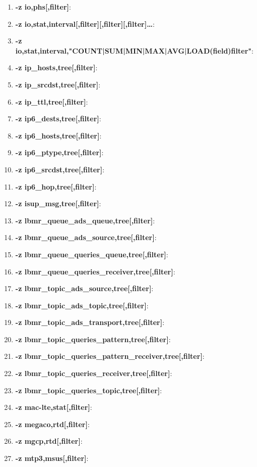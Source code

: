 \begin{enumerate}
    \item \textbf{-z io,phs[,filter]}: 
    \item \textbf{-z io,stat,interval[,filter][,filter][,filter]…​}: 
    \item \textbf{-z io,stat,interval,"COUNT|SUM|MIN|MAX|AVG|LOAD(field)filter"}: 
    \item \textbf{-z ip\_hosts,tree[,filter]}: 
    \item \textbf{-z ip\_srcdst,tree[,filter]}: 
    \item \textbf{-z ip\_ttl,tree[,filter]}: 
    \item \textbf{-z ip6\_dests,tree[,filter]}: 
    \item \textbf{-z ip6\_hosts,tree[,filter]}: 
    \item \textbf{-z ip6\_ptype,tree[,filter]}: 
    \item \textbf{-z ip6\_srcdst,tree[,filter]}: 
    \item \textbf{-z ip6\_hop,tree[,filter]}: 
    \item \textbf{-z isup\_msg,tree[,filter]}: 
    \item \textbf{-z lbmr\_queue\_ads\_queue,tree[,filter]}: 
    \item \textbf{-z lbmr\_queue\_ads\_source,tree[,filter]}: 
    \item \textbf{-z lbmr\_queue\_queries\_queue,tree[,filter]}: 
    \item \textbf{-z lbmr\_queue\_queries\_receiver,tree[,filter]}: 
    \item \textbf{-z lbmr\_topic\_ads\_source,tree[,filter]}: 
    \item \textbf{-z lbmr\_topic\_ads\_topic,tree[,filter]}: 
    \item \textbf{-z lbmr\_topic\_ads\_transport,tree[,filter]}: 
    \item \textbf{-z lbmr\_topic\_queries\_pattern,tree[,filter]}: 
    \item \textbf{-z lbmr\_topic\_queries\_pattern\_receiver,tree[,filter]}: 
    \item \textbf{-z lbmr\_topic\_queries\_receiver,tree[,filter]}: 
    \item \textbf{-z lbmr\_topic\_queries\_topic,tree[,filter]}: 
    \item \textbf{-z mac-lte,stat[,filter]}: 
    \item \textbf{-z megaco,rtd[,filter]}: 
    \item \textbf{-z mgcp,rtd[,filter]}: 
    \item \textbf{-z mtp3,msus[,filter]}: 

\end{enumerate}
